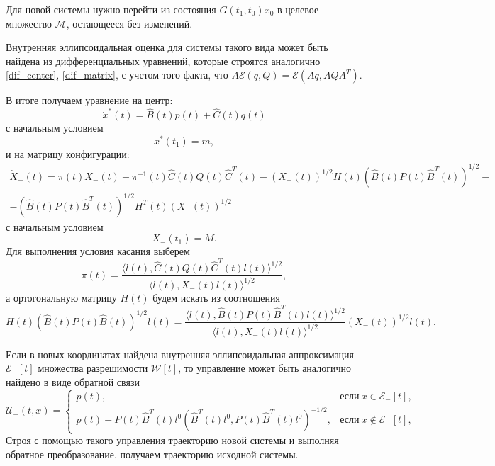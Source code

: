 Для новой системы нужно перейти из состояния \( G(t_1, t_0) x_0 \) в целевое множество \( \mathcal{M} \), остающееся без изменений.

Внутренняя эллипсоидальная оценка для системы такого вида может быть найдена из дифференциальных уравнений, которые строятся
 аналогично \eqref{dif_center}, \eqref{dif_matrix}, с учетом того факта, что  \( A \mathcal{E}(q, Q) = \mathcal{E}(Aq, AQA^T) \).

В итоге получаем уравнение на центр:
\begin{equation*}\label{A_dif_center}
    \dot{x}^*(t) = \hat{B}(t) p(t) + \hat{C}(t) q(t)
\end{equation*}
с начальным условием
\begin{equation*}\label{A_dif_center_bound}
    x^*(t_1) = m,
\end{equation*}
и на матрицу конфигурации:
\begin{gather*}\label{A_dif_matrix}
    \dot{X}_-(t) = \pi(t) X_-(t) + \pi^{-1}(t) \hat{C}(t) Q(t) \hat{C}^T(t) - (X_-(t))^{1/2} H(t) (\hat{B}(t) P(t) \hat{B}^T(t))^{1/2} - \\
     - (\hat{B}(t) P(t) \hat{B}^T(t))^{1/2} H^T(t) (X_-(t))^{1/2}
\end{gather*}
с начальным условием
\begin{equation*}\label{A_dif_matr_bound}
    X_-(t_1) = M.
\end{equation*}
Для выполнения условия касания выберем
\begin{equation*}
    \pi(t) = \frac{\langle l(t), \hat{C}(t) Q(t) \hat{C}^T(t) l(t) \rangle^{1/2}}{\langle l(t), X_-(t) l(t) \rangle^{1/2}},
\end{equation*}
а ортогональную матрицу \( H(t) \) будем искать из соотношения
\begin{equation*}
    H(t)(\hat{B}(t) P(t) \hat{B}(t))^{1/2} l(t) = \frac{\langle l(t), \hat{B}(t) P(t) \hat{B}^T(t) l(t) \rangle^{1/2}}{\langle l(t), X_-(t) l(t) \rangle^{1/2}} (X_-(t))^{1/2} l(t).
\end{equation*}

Если в новых координатах найдена внутренняя эллипсоидальная аппроксимация \( \mathcal{E}_-[t] \) множества разрешимости \( \mathcal{W}[t] \), то
управление может быть аналогично найдено в виде обратной связи
\begin{equation*}
    \mathcal{U}_-(t,x) = 
     \begin{cases}
        p(t), & \text{если} \ x \in \mathcal{E}_-[t], \\
        p(t) - P(t)\hat{B}^T(t)l^0(\hat{B}^T(t)l^0, P(t)\hat{B}^T(t)l^0)^{-1/2}, & \text{если} \ x \notin \mathcal{E}_-[t],
     \end{cases}
\end{equation*}
Строя с помощью такого управления траекторию новой системы и выполняя обратное преобразование, получаем 
траекторию исходной системы.

